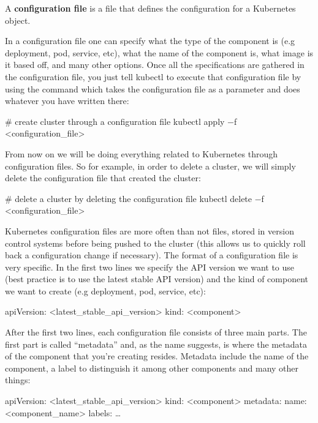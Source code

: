A \textbf{configuration file} is a file that defines the configuration for a Kubernetes object.
\ed

In a configuration file one can specify what the type of the component is (e.g deployment, pod, service, etc), what
the name of the component is, what image is it based off, and many other options. Once all the specifications are
gathered in the configuration file, you just tell kubectl to execute that configuration file by using the
 command which takes the configuration file as a parameter and does whatever you have written there:

\begin{bash}
# create cluster through a configuration file
kubectl apply $-$f <configuration_file>
\end{bash}

From now on we will be doing everything related to Kubernetes through configuration files. So for example, in order
to delete a cluster, we will simply delete the configuration file that created the cluster:

\begin{bash}
# delete a cluster by deleting the configuration file
kubectl delete $-$f <configuration_file>
\end{bash}

Kubernetes configuration files are more often than not  files, stored in version control systems before
being pushed to the cluster (this allows us to quickly roll back a configuration change if necessary). The format of
a configuration file is very specific. In the first two lines we specify the API version we want to use (best
practice is to use the latest stable API version) and the kind of component we want to create (e.g deployment, pod,
service, etc):

\begin{block}
apiVersion: <latest_stable_api_version>
kind: <component>
\end{block}

After the first two lines, each configuration file consists of three main parts. The first part is called
``metadata'' and, as the name suggests, is where the metadata of the component that you're creating resides. Metadata
include the name of the component, a label to distinguish it among other components and many other things:

\begin{block}
apiVersion: <latest_stable_api_version>
kind: <component>
metadata:
   name: <component_name>
   labels: \dots
\end{block}

